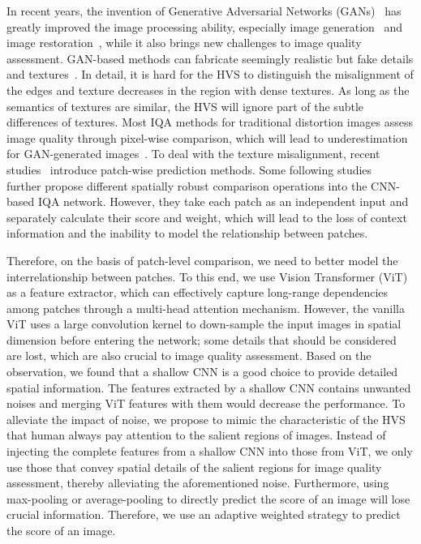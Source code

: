 \documentclass[10pt,twocolumn,letterpaper]{article}
\begin{document}
In recent years, the invention of Generative Adversarial Networks (GANs)~\cite{goodfellow2014generative} has greatly improved the image processing ability, especially image generation~\cite{gu2020image,xia2021tedigan} and image restoration~\cite{wang2018esrgan}, while it also brings new challenges to image quality assessment. GAN-based methods can fabricate seemingly realistic but fake details and textures~\cite{jinjin2020pipal}. In detail, it is hard for the HVS to distinguish the misalignment of the edges and texture decreases in the region with dense textures. As long as the semantics of textures are similar, the HVS will ignore part of the subtle differences of textures. Most IQA methods for traditional distortion images assess image quality through pixel-wise comparison, which will lead to underestimation for GAN-generated images~\cite{wang2004image}. To deal with the texture misalignment, recent studies~\cite{bosse2017deep} introduce patch-wise prediction methods. 
Some following studies~\cite{shi2021region,jinjin2020pipal} further propose different spatially robust comparison operations into the CNN-based IQA network. However, they take each patch as an independent input and separately calculate their score and weight, which will lead to the loss of context information and the inability to model the relationship between patches. 

Therefore, on the basis of patch-level comparison, we need to better model the interrelationship between patches. To this end, we use Vision Transformer (ViT)~\cite{dosovitskiy2020image} as a feature extractor, which can effectively capture long-range dependencies among patches through a multi-head attention mechanism. However, the vanilla ViT uses a large convolution kernel to down-sample the input images in spatial dimension before entering the network; some details that should be considered are lost, which are also crucial to image quality assessment. Based on the observation, we found that a shallow CNN is a good choice to provide detailed spatial information. 
The features extracted by a shallow CNN contains unwanted noises and merging ViT features with them would decrease the performance. To alleviate the impact of noise, we propose to mimic the characteristic of the HVS that human always pay attention to the salient regions of images. 
Instead of injecting the complete features from a shallow CNN into those from ViT, we only use those that convey spatial details of the salient regions for image quality assessment, thereby alleviating the aforementioned noise.
Furthermore, using max-pooling or average-pooling to directly predict the score of an image will lose crucial information.
Therefore, we use an adaptive weighted strategy to predict the score of an image.
\end{document}
